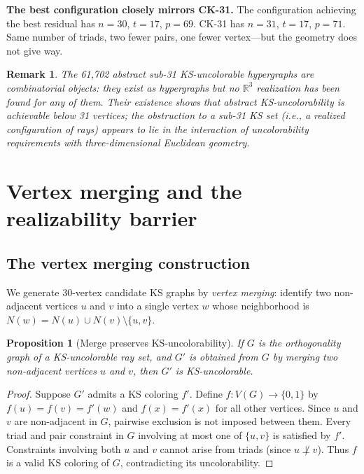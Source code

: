 \documentclass[twocolumn,pra,superscriptaddress,nofootinbib]{revtex4-2}
\newtheorem{proposition}{Proposition}
\newtheorem{remark}{Remark}
\newcommand{\R}{\mathbb{R}}
\begin{document}
\textbf{The best configuration closely mirrors CK-31.} The configuration achieving the best residual has $n = 30$, $t = 17$, $p = 69$. CK-31 has $n = 31$, $t = 17$, $p = 71$. Same number of triads, two fewer pairs, one fewer vertex---but the geometry does not give way.

\begin{remark}
The 61,702 abstract sub-31 KS-uncolorable hypergraphs are combinatorial objects: they exist as hypergraphs but no $\R^3$ realization has been found for any of them. Their existence shows that abstract KS-uncolorability is achievable below 31 vertices; the obstruction to a sub-31 KS \emph{set} (i.e., a realized configuration of rays) appears to lie in the interaction of uncolorability requirements with three-dimensional Euclidean geometry.
\end{remark}

\section{Vertex merging and the realizability barrier}
\label{sec:merging}

\subsection{The vertex merging construction}

We generate 30-vertex candidate KS graphs by \emph{vertex merging}: identify two non-adjacent vertices $u$ and $v$ into a single vertex $w$ whose neighborhood is $N(w) = N(u) \cup N(v) \setminus \{u, v\}$.

\begin{proposition}[Merge preserves KS-uncolorability]
\label{prop:merge}
If $G$ is the orthogonality graph of a KS-uncolorable ray set, and $G'$ is obtained from $G$ by merging two non-adjacent vertices $u$ and $v$, then $G'$ is KS-uncolorable.
\end{proposition}

\begin{proof}
Suppose $G'$ admits a KS coloring $f'$. Define $f: V(G) \to \{0,1\}$ by $f(u) = f(v) = f'(w)$ and $f(x) = f'(x)$ for all other vertices. Since $u$ and $v$ are non-adjacent in $G$, pairwise exclusion is not imposed between them. Every triad and pair constraint in $G$ involving at most one of $\{u,v\}$ is satisfied by $f'$. Constraints involving both $u$ and $v$ cannot arise from triads (since $u \not\perp v$). Thus $f$ is a valid KS coloring of $G$, contradicting its uncolorability.
\end{proof}
\end{document}
